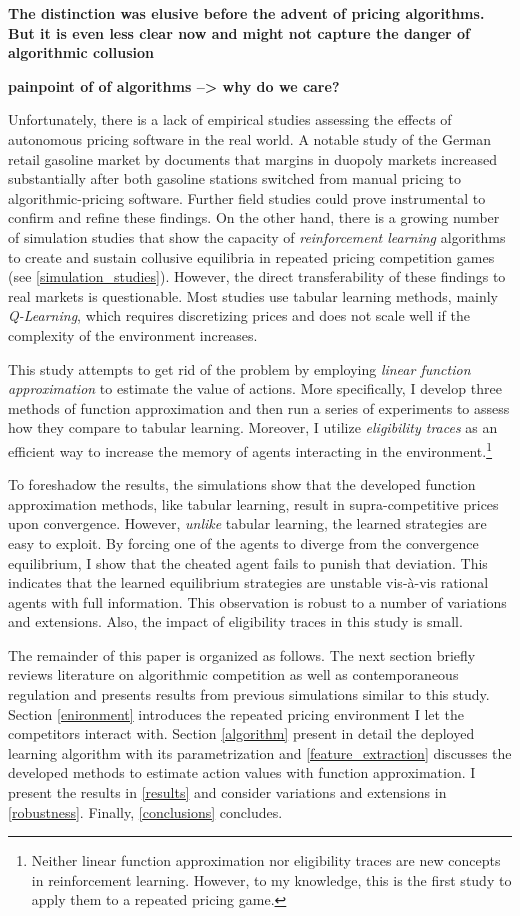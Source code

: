 \textbf{The distinction was elusive before the advent of pricing algorithms. But it is even less clear now and might not capture the danger of algorithmic collusion}

\textbf{painpoint of of algorithms --> why do we care?} 

Unfortunately, there is a lack of empirical studies assessing the effects of autonomous pricing software in the real world. A notable study of the German retail gasoline market by \textcite{assad_algorithmic_2020} documents that margins in duopoly markets increased substantially after both gasoline stations switched from manual pricing to algorithmic-pricing software. Further field studies could prove instrumental to confirm and refine these findings. On the other hand, there is a growing number of simulation studies that show the capacity of \emph{reinforcement learning} algorithms to create and sustain collusive equilibria in repeated pricing competition games (see \autoref{simulation_studies}). However, the direct transferability of these findings to real markets is questionable. Most studies use tabular learning methods, mainly \emph{Q-Learning}, which requires discretizing prices and does not scale well if the complexity of the environment increases.

This study attempts to get rid of the problem by employing \emph{linear function approximation} to estimate the value of actions. More specifically, I develop three methods of function approximation and then run a series of experiments to assess how they compare to tabular learning. Moreover, I utilize \emph{eligibility traces} as an efficient way to increase the memory of agents interacting in the environment.\footnote{Neither linear function approximation nor eligibility traces are new concepts in reinforcement learning. However, to my knowledge, this is the first study to apply them to a repeated pricing game.}

To foreshadow the results, the simulations show that the developed function approximation methods, like tabular learning, result in supra-competitive prices upon convergence. However, \emph{unlike} tabular learning, the learned strategies are easy to exploit. By forcing one of the agents to diverge from the convergence equilibrium, I show that the cheated agent fails to punish that deviation. This indicates that the learned equilibrium strategies are unstable vis-à-vis rational agents with full information. This observation is robust to a number of variations and extensions. Also, the impact of eligibility traces in this study is small.

The remainder of this paper is organized as follows. The next section briefly reviews literature on algorithmic competition as well as contemporaneous regulation and presents results from previous simulations similar to this study. Section \ref{enironment} introduces the repeated pricing environment I let the competitors interact with. Section \ref{algorithm} present in detail the deployed learning algorithm with its parametrization and \autoref{feature_extraction} discusses the developed methods to estimate action values with function approximation. I present the results in \autoref{results} and consider variations and extensions in \autoref{robustness}. Finally, \autoref{conclusions} concludes.